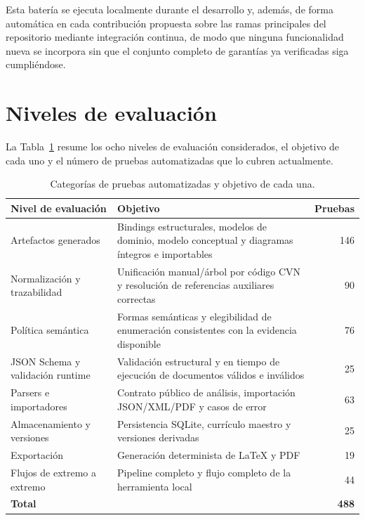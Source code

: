 Esta batería se ejecuta localmente durante el desarrollo y, además, de forma
automática en cada contribución propuesta sobre las ramas principales del
repositorio mediante integración continua, de modo que ninguna
funcionalidad nueva se incorpora sin que el conjunto completo de garantías ya
verificadas siga cumpliéndose.

\section{Niveles de evaluación}
\label{sec:evaluacion_niveles}

La Tabla~\ref{tab:evaluacion_categorias} resume los ocho niveles de
evaluación considerados, el objetivo de cada uno y el número de pruebas
automatizadas que lo cubren actualmente.

\begin{table}[htbp]
  \centering
  \footnotesize
  \renewcommand{\arraystretch}{1.5}
  \caption{Categorías de pruebas automatizadas y objetivo de cada una.}
  \label{tab:evaluacion_categorias}
  \begin{tabular}{p{} p{} r}
    \hline
    \textbf{Nivel de evaluación} & \textbf{Objetivo} & \textbf{Pruebas} \\
    \hline
    Artefactos generados & Bindings estructurales, modelos de dominio, modelo conceptual y diagramas íntegros e importables & 146 \\
    Normalización y trazabilidad & Unificación manual/árbol por código CVN y resolución de referencias auxiliares correctas & 90 \\
    Política semántica & Formas semánticas y elegibilidad de enumeración consistentes con la evidencia disponible & 76 \\
    JSON Schema y validación runtime & Validación estructural y en tiempo de ejecución de documentos válidos e inválidos & 25 \\
    Parsers e importadores & Contrato público de análisis, importación JSON/XML/PDF y casos de error & 63 \\
    Almacenamiento y versiones & Persistencia SQLite, currículo maestro y versiones derivadas & 25 \\
    Exportación & Generación determinista de LaTeX y PDF & 19 \\
    Flujos de extremo a extremo & Pipeline completo y flujo completo de la herramienta local & 44 \\
    \hline
    \textbf{Total} & & \textbf{488} \\
    \hline
  \end{tabular}
\end{table}

